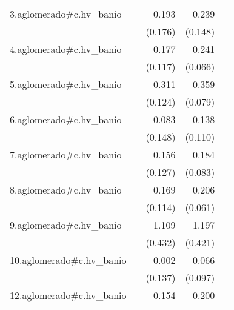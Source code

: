 {\begin{longtable}{l*{4}{D{.}{.}{-1}}}
\addlinespace
3.aglomerado#c.hv\_banio&                     &       0.193         &       0.239         &                     \\
            &                     &     (0.176)         &     (0.148)         &                     \\
\addlinespace
4.aglomerado#c.hv\_banio&                     &       0.177         &       0.241\sym{***}&                     \\
            &                     &     (0.117)         &     (0.066)         &                     \\
\addlinespace
5.aglomerado#c.hv\_banio&                     &       0.311\sym{*}  &       0.359\sym{***}&                     \\
            &                     &     (0.124)         &     (0.079)         &                     \\
\addlinespace
6.aglomerado#c.hv\_banio&                     &       0.083         &       0.138         &                     \\
            &                     &     (0.148)         &     (0.110)         &                     \\
\addlinespace
7.aglomerado#c.hv\_banio&                     &       0.156         &       0.184\sym{*}  &                     \\
            &                     &     (0.127)         &     (0.083)         &                     \\
\addlinespace
8.aglomerado#c.hv\_banio&                     &       0.169         &       0.206\sym{***}&                     \\
            &                     &     (0.114)         &     (0.061)         &                     \\
\addlinespace
9.aglomerado#c.hv\_banio&                     &       1.109\sym{*}  &       1.197\sym{**} &                     \\
            &                     &     (0.432)         &     (0.421)         &                     \\
\addlinespace
10.aglomerado#c.hv\_banio&                     &       0.002         &       0.066         &                     \\
            &                     &     (0.137)         &     (0.097)         &                     \\
\addlinespace
12.aglomerado#c.hv\_banio&                     &       0.154         &       0.200         &                     \\

\end{longtable}}
